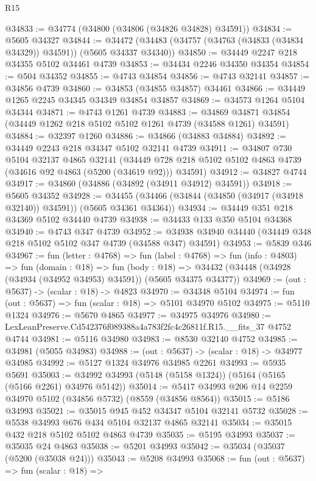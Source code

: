 \begin{lexlean}{R15}
\begin{coremodule}
{{{{{{{{{{{@34833 := @34774 (@34800 (@34806 (@34826 @34828) @34591))
@34834 := @5605 @34327
@34844 := @34472 (@34483 (@34757 (@34763 (@34833 (@34834 @34329)) @34591)) (@5605 @34337 @34340))
@34850 := @34449 @2247 @218 @34355 @5102 @34461 @4739
@34853 := @34434 @2246 @34350 @34354
@34854 := @504 @34352
@34855 := @4743 @34854
@34856 := @4743 @32141
@34857 := @34856 @4739
@34860 := @34853 (@34855 @34857) @34461
@34866 := @34449 @1265 @2245 @34345 @34349 @34854 @34857
@34869 := @34573 @1264 @5104 @34344
@34871 := @4743 @1261 @4739
@34883 := @34869 @34871 @34854 (@34449 @1262 @218 @5102 @5102 @1261 @4739 (@34588 @1261) @34591)
@34884 := @32397 @1260
@34886 := @34866 (@34883 @34884)
@34892 := @34449 @2243 @218 @34347 @5102 @32141 @4739
@34911 := @34807
    @730
    @5104
    @32137
    @4865
    @32141
    (@34449 @728 @218 @5102 @5102 @4863 @4739 (@34616 @92 @4863 (@5200 (@34619 @92))) @34591)
@34912 := @34827 @4744
@34917 := @34860 (@34886 (@34892 (@34911 @34912) @34591))
@34918 := @5605 @34352
@34928 := @34455 (@34466 (@34844 (@34850 (@34917 (@34918 @32140)) @34591)) (@5605 @34361 @34364))
@34934 := @34449 @351 @218 @34369 @5102 @34440 @4739
@34938 := @34433 @133 @350 @5104 @34368
@34940 := @4743 @347 @4739
@34952 := @34938 @34940 @34440 (@34449 @348 @218 @5102 @5102 @347 @4739 (@34588 @347) @34591)
@34953 := @5839 @346
@34967 := fun (letter : @4768) =>
  fun (label : @4768) =>
  fun (info : @4803) =>
  fun (domain : @18) =>
  fun (body : @18) => @34432 (@34448 (@34928 (@34934 (@34952 @34953) @34591)) (@5605 @34375 @34377))
@34969 := (out : @5637) -> (scalar : @18) -> @4823
@34970 := @34348 @5104
@34974 := fun (out : @5637) => fun (scalar : @18) => @5101 @34970 @5102
@34975 := @5110 @1324
@34976 := @5670 @4865
@34977 := @34975 @34976
@34980 := LexLeanPreserve.Cd542376f089388a4a783f2fc4c26811f.R15.__fits_37 @4752 @4744
@34981 := @5116 @34980
@34983 := @8530 @32140 @4752
@34985 := @34981 (@5055 @34983)
@34988 := (out : @5637) -> (scalar : @18) -> @34977 @34985
@34992 := @5127 @1324 @34976 @34985 @2261
@34993 := @5935 @5691
@35003 := @34992 @34993 (@5148 (@5158 @1324)) (@5164 (@5165 (@5166 @2261) @34976 @5142))
@35014 := @5417 @34993 @206 @14 @2259 @34970 @5102 (@34856 @5732) (@8559 (@34856 @8564))
@35015 := @5186 @34993
@35021 := @35015 @945 @452 @34347 @5104 @32141 @5732
@35028 := @5538 @34993 @676 @434 @5104 @32137 @4865 @32141
@35034 := @35015 @432 @218 @5102 @5102 @4863 @4739
@35035 := @5195 @34993
@35037 := @35035 @24 @4863
@35038 := @5201 @34993
@35042 := @35034 (@35037 (@5200 (@35038 @24)))
@35043 := @5208 @34993
@35068 := fun (out : @5637) =>
  fun (scalar : @18) =>
}}}}}}}}}}}
\end{coremodule}
\end{lexlean}
